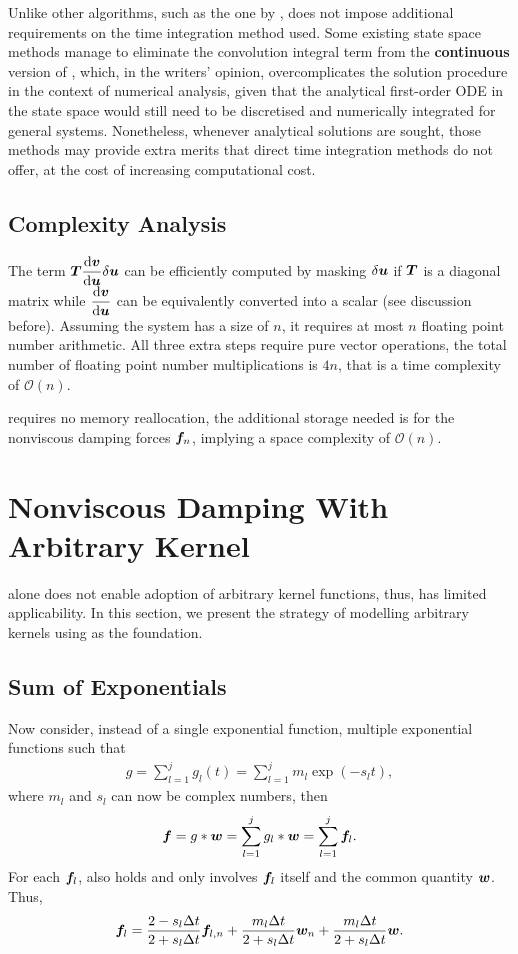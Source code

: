 Unlike other algorithms, such as the one by \citet{Cortes2009},  does not impose additional requirements on the time integration method used. Some existing state space methods manage to eliminate the convolution integral term from the \textbf{continuous} version of  \citep[see][]{Wagner2003,Wu2019}, which, in the writers' opinion, overcomplicates the solution procedure in the context of numerical analysis, given that the analytical first-order ODE in the state space would still need to be discretised \citep{Adhikari2004} and numerically integrated for general systems. Nonetheless, whenever analytical solutions are sought, those methods may provide extra merits that direct time integration methods do not offer, at the cost of increasing computational cost.
\subsection{Complexity Analysis}
The term $\bm{T}\dfrac{\mathrm{d}\bm{v}}{\mathrm{d}\bm{u}}\delta\bm{u}$ can be efficiently computed by masking $\delta\bm{u}$ if $\bm{T}$ is a diagonal matrix while $\dfrac{\mathrm{d}\bm{v}}{\mathrm{d}\bm{u}}$ can be equivalently converted into a scalar (see discussion before). Assuming the system has a size of $n$, it requires at most $n$ floating point number arithmetic. All three extra steps require pure vector operations, the total number of floating point number multiplications is $4n$, that is a time complexity of $\mathcal{O}\left(n\right)$.

 requires no memory reallocation, the additional storage needed is for the nonviscous damping forces $\bm{f}_n$, implying a space complexity of $\mathcal{O}\left(n\right)$.
\section{Nonviscous Damping With Arbitrary Kernel}\label{sec:arbitrary}
 alone does not enable adoption of arbitrary kernel functions, thus, has limited applicability. In this section, we present the strategy of modelling arbitrary kernels using  as the foundation.
\subsection{Sum of Exponentials}
Now consider, instead of a single exponential function, multiple exponential functions such that
\begin{gather}\label{eq:sum_exp}
g=\sum_{l=1}^{j}g_l\left(t\right)=\sum_{l=1}^{j}m_l\exp\left(-s_lt\right),
\end{gather}
where $m_l$ and $s_l$ can now be complex numbers, then
\begin{gather}\label{eq:sum_conv}
\bm{f}=g*\bm{w}=\sum_{l=1}^{j}g_l*\bm{w}=\sum_{l=1}^{j}\bm{f}_l.
\end{gather}
For each $\bm{f}_l$,  also holds and only involves $\bm{f}_l$ itself and the common quantity $\bm{w}$. Thus,
\begin{gather}
\bm{f}_l=\dfrac{2-s_l\Delta{}t}{2+s_l\Delta{}t}\bm{f}_{l,n}+\dfrac{m_l\Delta{}t}{2+s_l\Delta{}t}\bm{w}_n+\dfrac{m_l\Delta{}t}{2+s_l\Delta{}t}\bm{w}.
\end{gather}

